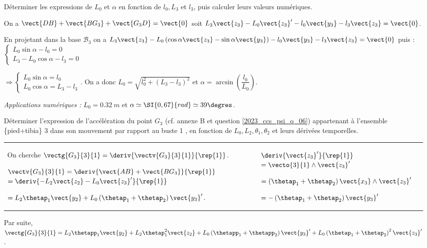 \begin{question}
\label{2023_ccs_psi_q_06}
Déterminer les expressions de $L_{0}$ et $\alpha$ en fonction de $l_{0}, L_{3}$ et $l_{3}$, puis calculer leurs valeurs numériques.
\end{question}
\ifprof
\begin{corrige}
On a $\vect{DB}+\vect{BG_3}+\vect{G_3D} = \vect{0}$ soit $L_3\vect{z_3}-L_0\vect{z_3}'-l_0\vect{y_3}-l_3\vect{z_3} = \vect{0}$. 

En projetant dans la base $\mathcal{B}_3$ on a 
$L_3\vect{z_3}-L_0\left(\cos\alpha \vect{z_3} - \sin\alpha \vect{y_3} \right)-l_0\vect{y_3}-l_3\vect{z_3} = \vect{0}$ puis : 
$
\left\{ \begin{array}{l}
L_0 \sin\alpha -l_0 = 0 \\
L_3-L_0 \cos\alpha -l_3 = 0
\end{array}
\right.
$

$
\Rightarrow 
\left\{ \begin{array}{l}
L_0 \sin\alpha = l_0  \\
L_0 \cos\alpha  = L_3 - l_3 
\end{array}
\right.
$.
On a donc $L_0 =\sqrt{l_0 ^2 + \left(L_3- l_3\right)^2}$ et $\alpha = \arcsin \left(\dfrac{l_0}{L_0}\right)$.

\textit{Applications numériques : } $L_0= \SI{0,32}{m}$ et $\alpha \simeq \SI{0,67}{rad} \simeq 39\degres$.

\end{corrige}
\else
\fi


\begin{question}
\label{2023_ccs_psi_q_07}
Déterminer l'expression de l'accélération du point $G_{3}$ (cf. annexe B et question \ref{2023_ccs_psi_q_06}) appartenant à l'ensemble \{pied+tibia\} 3 dans son mouvement par rapport au buste 1 , en fonction de $L_{0}, L_{2}, \theta_{1}, \theta_{2}$ et leurs dérivées temporelles.\\
\end{question}
\ifprof
\begin{corrige}
\begin{tabular}{p{.68\linewidth}| p{.3\linewidth}}
On cherche $\vectg{G_3}{3}{1} = \deriv{\vectv{G_3}{3}{1}}{\rep{1}}$.

$\vectv{G_3}{3}{1} = \deriv{\vect{AB}+\vect{BG_3}}{\rep{1}}$
$= \deriv{-L_2 \vect{z_2} -L_0 \vect{z_3}'}{\rep{1}}$

$=L_2 \thetap_1\vect{y_2}  +L_0  \left(\thetap_1 + \thetap_2 \right)\vect{y_3}'$.
&
$\deriv{\vect{z_3}'}{\rep{1}} $ $=\vecto{3}{1}\wedge \vect{z_3}' $

$= \left(\thetap_1 + \thetap_2 \right)\vect{x_3} \wedge \vect{z_3}' $

$= - \left(\thetap_1 + \thetap_2 \right)\vect{y_3}' $ 
\\
\end{tabular}

Par suite, 
$\vectg{G_3}{3}{1} = L_2 \thetapp_1\vect{y_2}  +L_2 \thetap_1^2\vect{z_2}  + L_0  \left(\thetapp_1 + \thetapp_2 \right)\vect{y_3}'+ L_0  \left(\thetap_1 + \thetap_2 \right)^2\vect{z_3}'$.

\end{corrige}
\else
\fi


